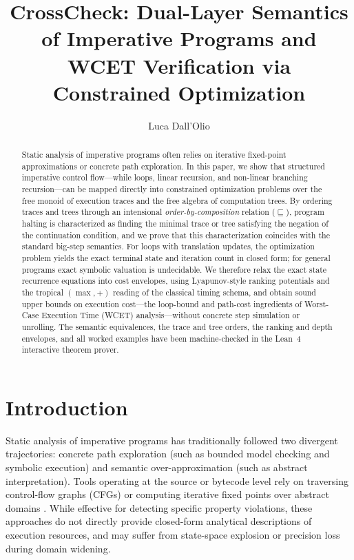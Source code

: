 \documentclass[oneside,english]{amsart}
\numberwithin{equation}{section}
\numberwithin{figure}{section}
\theoremstyle{plain}
\theoremstyle{definition}
\theoremstyle{plain}
\theoremstyle{remark}
\theoremstyle{plain}
\theoremstyle{definition}
\theoremstyle{plain}
\theoremstyle{remark}
\begin{document}
\title[CrossCheck: Dual-Layer Semantics and WCET Verification]{CrossCheck: Dual-Layer Semantics of Imperative Programs and WCET Verification via Constrained Optimization}
\author{Luca Dall'Olio}
\begin{abstract}
Static analysis of imperative programs often relies on iterative fixed-point approximations or concrete path exploration. In this paper, we show that structured imperative control flow---while loops, linear recursion, and non-linear branching recursion---can be mapped directly into constrained optimization problems over the free monoid of execution traces and the free algebra of computation trees. By ordering traces and trees through an intensional \textit{order-by-composition} relation ($\sqsubseteq$), program halting is characterized as finding the minimal trace or tree satisfying the negation of the continuation condition, and we prove that this characterization coincides with the standard big-step semantics. For loops with translation updates, the optimization problem yields the exact terminal state and iteration count in closed form; for general programs exact symbolic valuation is undecidable. We therefore relax the exact state recurrence equations into cost envelopes, using Lyapunov-style ranking potentials and the tropical $(\max, +)$ reading of the classical timing schema, and obtain sound upper bounds on execution cost---the loop-bound and path-cost ingredients of Worst-Case Execution Time (WCET) analysis---without concrete step simulation or unrolling. The semantic equivalences, the trace and tree orders, the ranking and depth envelopes, and all worked examples have been machine-checked in the Lean~4 interactive theorem prover.
\end{abstract}

\maketitle

\section{Introduction}

Static analysis of imperative programs has traditionally followed two divergent trajectories:
concrete path exploration (such as bounded model checking and symbolic execution) and semantic
over-approximation (such as abstract interpretation). Tools operating at the source or bytecode level
rely on traversing control-flow graphs (CFGs) or computing iterative fixed points over abstract
domains \cite{cousot1977abstract}. While effective for detecting specific property violations,
these approaches do not directly provide closed-form analytical descriptions of execution resources,
and may suffer from state-space explosion or precision loss during domain widening.
\end{document}
